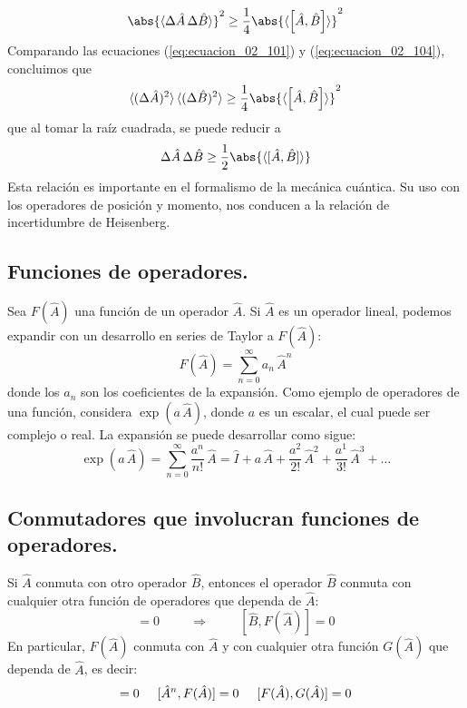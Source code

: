 \begin{equation}
\abs{ \langle \Delta \hat{A} \, \Delta \hat{B} \rangle}^{2} \geq \dfrac{1}{4} \abs{\langle \left[ \hat{A}, \hat{B} \right] \rangle}^{2}
\label{eq:ecuacion_02_104}
\end{equation}
Comparando las ecuaciones (\ref{eq:ecuacion_02_101}) y (\ref{eq:ecuacion_02_104}), concluimos que
\begin{equation}
\langle (\Delta \hat{A})^{2} \rangle \, \langle (\Delta \hat{B})^{2} \rangle \geq \dfrac{1}{4} \abs{\langle \left[ \hat{A}, \hat{B} \right] \rangle}^{2}
\label{eq:ecuacion_02_105}
\end{equation}
que al tomar la raíz cuadrada, se puede reducir a
\begin{equation}
\Delta \hat{A} \, \Delta \hat{B} \geq \dfrac{1}{2} \abs{\langle [ \hat{A}, \hat{B} ] \rangle}
\label{eq:ecuacion_02_106}
\end{equation}
Esta relación es importante en el formalismo de la mecánica cuántica. Su uso con los operadores de posición y momento, nos conducen a la relación de incertidumbre de Heisenberg.
\subsection{Funciones de operadores.}
Sea $F(\hat{A})$ una función de un operador $\hat{A}$. Si $\hat{A}$ es un operador lineal, podemos expandir con un desarrollo en series de Taylor a $F(\hat{A})$:
\begin{equation}
F(\hat{A}) = \sum_{n=0}^{\infty} a_{n} \, \hat{A}^{n}
\label{eq:ecuacion_02_108}
\end{equation}
donde los $a_{n}$ son los coeficientes de la expansión. Como ejemplo de operadores de una función, considera $\exp(a \, \hat{A})$, donde $a$ es un escalar, el cual puede ser complejo o real. La expansión se puede desarrollar como sigue:
\begin{equation}
\exp(a \, \hat{A}) = \sum_{n=0}^{\infty} \dfrac{a^{n}}{n!} \, \hat{A} = \hat{I} + a \, \hat{A} + \dfrac{a^{2}}{2!} \, \hat{A}^{2} + \dfrac{a^{1}}{3!} \, \hat{A}^{3} + \ldots
\label{eq:ecuacion_02_109}
\end{equation}
\subsection*{Conmutadores que involucran funciones de operadores.}
Si $\hat{A}$ conmuta con otro operador $\hat{B}$, entonces el operador $\hat{B}$ conmuta con cualquier otra función de operadores que dependa de $\hat{A}$:
\begin{equation}
[\hat{A}, \hat{B}] = 0 \hspace{1cm} \Longrightarrow \hspace{1cm} [\hat{B}, F(\hat{A})] = 0
\label{eq:ecuacion_02_110}
\end{equation}
En particular, $F(\hat{A})$ conmuta con $\hat{A}$ y con cualquier otra función $G(\hat{A})$ que dependa de $\hat{A}$, es decir:
\begin{equation}
[\hat{A}, F(\hat{A})] = 0 \hspace{0.5cm} [\hat{A}^{n}, F(\hat{A})]= 0 \hspace{0.5cm} [F(\hat{A}), G(\hat{A})] = 0
\label{eq:ecuacion_02_111}
\end{equation}
